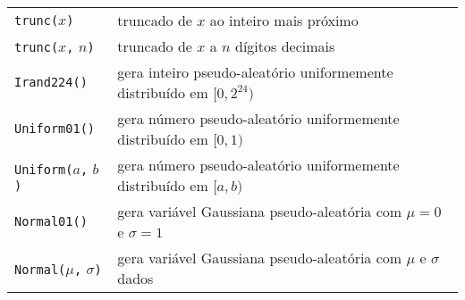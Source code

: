 \documentclass[11pt, brazil]{report}
\begin{document}
\begin{tabular}{@{}p{112pt}p{328pt}@{}}
{\tt trunc(}$x${\tt)}&truncado de $x$ ao inteiro mais próximo\\
{\tt trunc(}$x${\tt,} $n${\tt)}&truncado de $x$ a $n$ dígitos decimais\\
{\tt Irand224()}&gera inteiro pseudo-aleatório uniformemente distribuído
em $[0,2^{24})$\\
{\tt Uniform01()}&gera número pseudo-aleatório uniformemente distribuído
em $[0,1)$\\
{\tt Uniform(}$a${\tt,} $b${\tt)}&gera número pseudo-aleatório uniformemente
distribuído em $[a,b)$\\
{\tt Normal01()}&gera variável Gaussiana pseudo-aleatória com
$\mu=0$ e $\sigma=1$\\
{\tt Normal(}$\mu${\tt,} $\sigma${\tt)}&gera variável Gaussiana pseudo-aleatória
com $\mu$ e $\sigma$ dados\\
\end{tabular}
\end{document}
